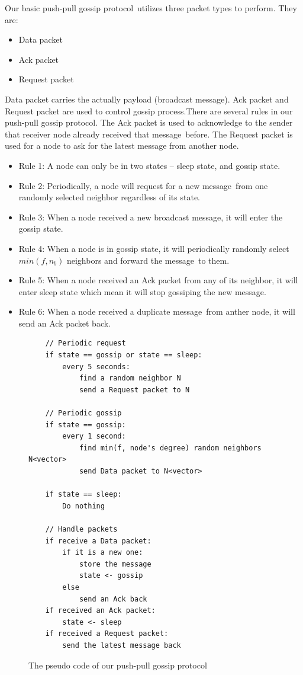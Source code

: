 \documentclass[onehalf,11pt]{beavtex}
\newcommand{\gp}{gossip protocol}
\newcommand{\msg}{message}
\begin{document}
Our basic push-pull \gp ~utilizes three packet types to perform. They are:
\begin{itemize}
	\item Data packet
	\item Ack packet 
	\item Request packet
\end{itemize}

Data packet carries the actually payload (broadcast \msg). Ack packet and Request packet are used to control gossip process.There are several rules in our push-pull \gp. The Ack packet is used to acknowledge to the sender that receiver node already received that \msg ~before. The Request packet is used for a node to ask for the latest message from another node.

\begin{itemize}
	\item Rule 1: A node can only be in two states -- sleep state, and gossip state.
	\item Rule 2: Periodically, a node will request for a new \msg ~from one randomly selected neighbor regardless of its state.
	\item Rule 3: When a node received a new broadcast \msg, it will enter the gossip state.
	\item Rule 4: When a node is in gossip state, it will periodically randomly select $min(f, n_b)$ neighbors and forward the \msg ~to them.
	\item Rule 5: When a node received an Ack packet from any of its neighbor, it will enter sleep state which mean it will stop gossiping the new \msg.
	\item Rule 6: When a node received a duplicate \msg ~from anther node, it will send an Ack packet back. 
\end{itemize}



\begin{figure}[!htbp]
	\centering
	\begin{Verbatim}
	// Periodic request 
	if state == gossip or state == sleep:
		every 5 seconds:
			find a random neighbor N
			send a Request packet to N
	
	// Periodic gossip	
	if state == gossip:
		every 1 second:
			find min(f, node's degree) random neighbors N<vector>
			send Data packet to N<vector>
	
	if state == sleep:
		Do nothing
	
	// Handle packets
	if receive a Data packet:
		if it is a new one:
			store the message
			state <- gossip
		else
			send an Ack back
	if received an Ack packet:
		state <- sleep
	if received a Request packet:
		send the latest message back	
	\end{Verbatim}
	\caption{The pseudo code of our push-pull \gp}
	\label{fig:pseudo}
\end{figure}
\end{document}
